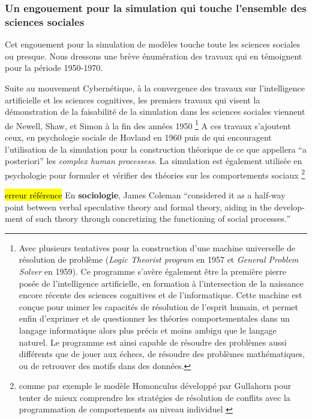 \subsubsection{Un engouement pour la simulation qui touche l'ensemble des sciences sociales}

Cet engouement pour la simulation de modèles touche toute les sciences sociales ou presque. Nous dressons une brève énumération des travaux qui en témoignent pour la période 1950-1970.

Suite au mouvement Cybernétique, à la convergence des travaux sur l'intelligence artificielle et les sciences cognitives, les premiers travaux qui visent la démonstration de la faisabilité de la simulation dans les sciences sociales viennent de Newell, Shaw, et Simon à la fin des années 1950 \autocite{Gullahorn1965} \footnote{Avec plusieurs tentatives pour la construction d'une machine universelle de résolution de problème (\textit{Logic Theorist program} en 1957 et \textit{General Problem Solver} en 1959). Ce programme s'avère également être la première pierre posée de l'intelligence artificielle, en formation à l'intersection de la naissance encore récente des sciences cognitives et de l'informatique. Cette machine est conçue pour mimer les capacités de résolution de l'esprit humain, et permet enfin d'exprimer et de questionner les théories comportementales dans un langage informatique alors plus précis et moins ambigu que le langage naturel. Le programme est ainsi capable de résoudre des problèmes aussi différents que de jouer aux échecs, de résoudre des problèmes mathématiques,  ou de retrouver des motifs dans des données.} A ces travaux s'ajoutent ceux, en psychologie sociale de Hovland en 1960 puis de \textcite{Abelson1968} qui encouragent l'utilisation de la simulation pour la construction théorique de ce que \textcite{Ostrom1988} appellera \foreignquote{latin}{a posteriori} les \textit{complex human processess}. La simulation est également utilisée en psychologie pour formuler et vérifier des théories sur les comportements sociaux \autocite{Gullahorn1965a} \footnote{ comme par exemple le modèle Homonculus développé par Gullahorn pour tenter de mieux comprendre les stratégies de résolution de conflits avec la programmation de comportements au niveau individuel \autocite{Gullahorn1965} }

\hl{erreur référence}
En \textbf{sociologie}, James Coleman \foreignquote{english}[Guetzkow1972, 36]{considered it as a half-way point between verbal speculative theory and formal theory, aiding in the development of such theory through concretizing the functioning of social processes.}

